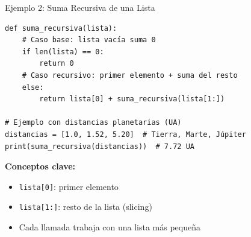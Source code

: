\documentclass[10pt]{beamer}
\begin{document}
\begin{frame}[fragile]{Ejemplo 2: Suma Recursiva de una Lista}
\begin{verbatim}
def suma_recursiva(lista):
    # Caso base: lista vacía suma 0
    if len(lista) == 0:
        return 0
    # Caso recursivo: primer elemento + suma del resto
    else:
        return lista[0] + suma_recursiva(lista[1:])

# Ejemplo con distancias planetarias (UA)
distancias = [1.0, 1.52, 5.20]  # Tierra, Marte, Júpiter
print(suma_recursiva(distancias))  # 7.72 UA
\end{verbatim}

\vspace{0.3cm}
\textbf{Conceptos clave:}
\begin{itemize}
  \item \texttt{lista[0]}: primer elemento
  \item \texttt{lista[1:]}: resto de la lista (slicing)
  \item Cada llamada trabaja con una lista más pequeña
\end{itemize}
\end{frame}
\end{document}
